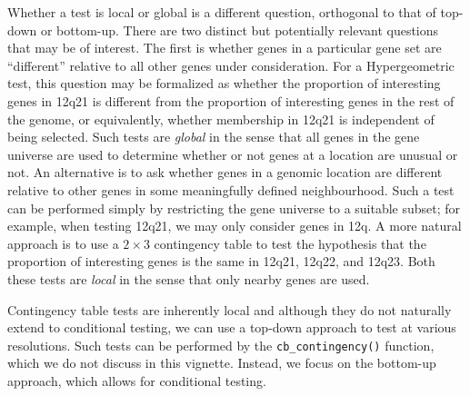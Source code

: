 \documentclass[11pt]{article}
\newcommand{\Rfunction}[1]{{\texttt{#1()}}}
\begin{document}
Whether a test is local or global is a different question, orthogonal
to that of top-down or bottom-up.  There are two distinct but
potentially relevant questions that may be of interest.  The first is
whether genes in a particular gene set are ``different'' relative to
all other genes under consideration.  For a Hypergeometric test, this
question may be formalized as whether the proportion of interesting
genes in 12q21 is different from the proportion of interesting genes
in the rest of the genome, or equivalently, whether membership in
12q21 is independent of being selected.  Such tests are
\textit{global} in the sense that all genes in the gene universe are
used to determine whether or not genes at a location are unusual or
not.  An alternative is to ask whether genes in a genomic location are
different relative to other genes in some meaningfully defined
neighbourhood.  Such a test can be performed simply by restricting the
gene universe to a suitable subset; for example, when testing 12q21,
we may only consider genes in 12q.  A more natural approach is to use
a $2 \times 3$ contingency table to test the hypothesis that the
proportion of interesting genes is the same in 12q21, 12q22, and
12q23.  Both these tests are \textit{local} in the sense that only
nearby genes are used.  

Contingency table tests are inherently local and although they do not
naturally extend to conditional testing, we can use a top-down
approach to test at various resolutions.  Such tests can be performed
by the \Rfunction{cb\_contingency} function, which we do not discuss in
this vignette.  Instead, we focus on the bottom-up approach, which
allows for conditional testing.



\end{document}
